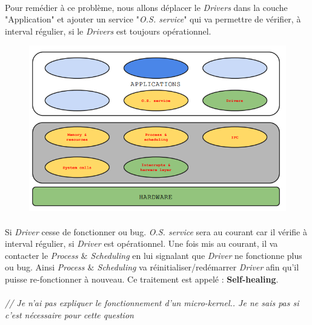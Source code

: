 \paragraph{}
Pour remédier à ce problème, nous allons déplacer le \textit{Drivers} dans la couche "Application" et ajouter un service "\textit{O.S. service}" qui va permettre de vérifier, à interval régulier, si le \textit{Drivers} est toujours opérationnel.
\begin{figure}[H]
\includegraphics[scale=0.7]{img_7_4__4}
\end{figure}

\paragraph{}
Si \textit{Driver} cesse de fonctionner ou bug. \textit{O.S. service} sera au courant car il vérifie à interval régulier, si \textit{Driver} est opérationnel. Une fois mis au courant, il va contacter le \textit{Process $\&$ Scheduling} en lui signalant que \textit{Driver} ne fonctionne plus ou bug. Ainsi \textit{Process $\&$ Scheduling} va réinitialiser/redémarrer \textit{Driver} afin qu'il puisse re-fonctionner à nouveau. Ce traitement est appelé : \textbf{Self-healing}.

\paragraph{}
\textit{// Je n'ai pas expliquer le fonctionnement d'un micro-kernel.. Je ne sais pas si c'est nécessaire pour cette question}


